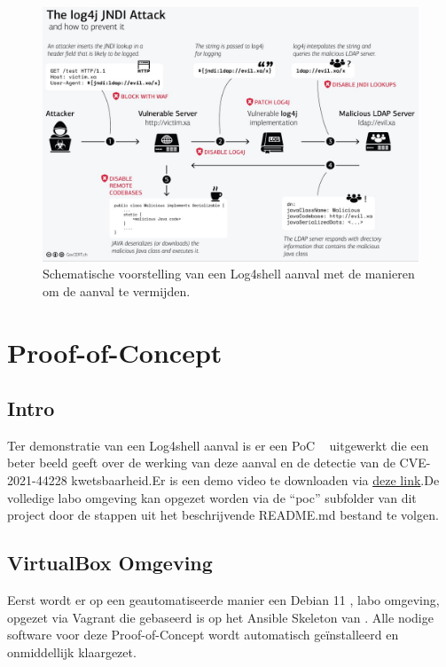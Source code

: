 \documentclass{hogent-article}
\begin{document}
\begin{figure}[!ht]
    \centering
    \includegraphics[width=1\linewidth]{img/log4jaanval.png}
    \caption{Schematische voorstelling van een Log4shell aanval met de manieren om de aanval te vermijden.}
    \label{fig:log4jaanval}
\end{figure}

\section{Proof-of-Concept}

\subsection{Intro}

Ter demonstratie van een Log4shell aanval is er een PoC ~\autocite{Akkurt2022} uitgewerkt die een beter beeld geeft over de werking van deze aanval en de detectie van de CVE-2021-44228 kwetsbaarheid.Er is een demo video te downloaden via \href{https://hogent-my.sharepoint.com/:v:/g/personal/thomas_thomas_y3313_student_hogent_be/EW-6cnKuqh1LmifrKeXAtLoB8SxmJZcj7Acj8Yl2-sFwqQ?e=1bDoFh}{\underline{deze link}}.De volledige labo omgeving kan opgezet worden via de ``poc'' subfolder van dit project door de stappen uit het beschrijvende README.md bestand te volgen.

\subsection{VirtualBox Omgeving}
Eerst wordt er op een geautomatiseerde manier een Debian 11 \autocite{boxomatic2022}, labo omgeving, opgezet via Vagrant die gebaseerd is op het Ansible Skeleton van \textcite{VanVrecken2020}. Alle nodige software voor deze Proof-of-Concept wordt automatisch geïnstalleerd en onmiddellijk klaargezet.
\end{document}
